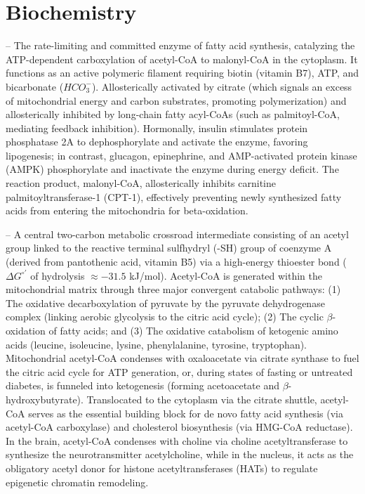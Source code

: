 \chapter{Biochemistry}

-- The rate-limiting and committed enzyme of fatty acid synthesis, catalyzing the ATP-dependent carboxylation of acetyl-CoA to malonyl-CoA in the cytoplasm. It functions as an active polymeric filament requiring biotin (vitamin B7), ATP, and bicarbonate ($HCO_3^-$). Allosterically activated by citrate (which signals an excess of mitochondrial energy and carbon substrates, promoting polymerization) and allosterically inhibited by long-chain fatty acyl-CoAs (such as palmitoyl-CoA, mediating feedback inhibition). Hormonally, insulin stimulates protein phosphatase 2A to dephosphorylate and activate the enzyme, favoring lipogenesis; in contrast, glucagon, epinephrine, and AMP-activated protein kinase (AMPK) phosphorylate and inactivate the enzyme during energy deficit. The reaction product, malonyl-CoA, allosterically inhibits carnitine palmitoyltransferase-1 (CPT-1), effectively preventing newly synthesized fatty acids from entering the mitochondria for beta-oxidation.

-- A central two-carbon metabolic crossroad intermediate consisting of an acetyl group linked to the reactive terminal sulfhydryl (-SH) group of coenzyme A (derived from pantothenic acid, vitamin B5) via a high-energy thioester bond ($\Delta G^{\circ\prime}$ of hydrolysis $\approx -31.5$ kJ/mol). Acetyl-CoA is generated within the mitochondrial matrix through three major convergent catabolic pathways: (1) The oxidative decarboxylation of pyruvate by the pyruvate dehydrogenase complex (linking aerobic glycolysis to the citric acid cycle); (2) The cyclic $\beta$-oxidation of fatty acids; and (3) The oxidative catabolism of ketogenic amino acids (leucine, isoleucine, lysine, phenylalanine, tyrosine, tryptophan). Mitochondrial acetyl-CoA condenses with oxaloacetate via citrate synthase to fuel the citric acid cycle for ATP generation, or, during states of fasting or untreated diabetes, is funneled into ketogenesis (forming acetoacetate and $\beta$-hydroxybutyrate). Translocated to the cytoplasm via the citrate shuttle, acetyl-CoA serves as the essential building block for de novo fatty acid synthesis (via acetyl-CoA carboxylase) and cholesterol biosynthesis (via HMG-CoA reductase). In the brain, acetyl-CoA condenses with choline via choline acetyltransferase to synthesize the neurotransmitter acetylcholine, while in the nucleus, it acts as the obligatory acetyl donor for histone acetyltransferases (HATs) to regulate epigenetic chromatin remodeling.

